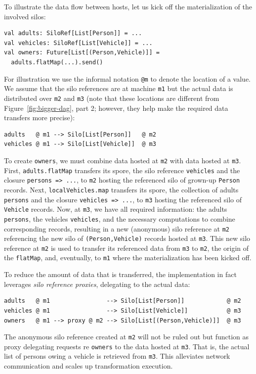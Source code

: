 \documentclass{jfp1}
\begin{document}
To illustrate the data flow between hosts, let us kick off the
materialization of the involved silos:
\begin{lstlisting}
val adults: SiloRef[List[Person]] = ...
val vehicles: SiloRef[List[Vehicle]] = ...
val owners: Future[List[(Person,Vehicle)]] =
  adults.flatMap(...).send()
\end{lstlisting}
\noindent
For illustration we use the informal notation \verb|@m| to denote the
location of a value. We assume that the silo references are at machine
\verb|m1| but the actual data is distributed over \verb|m2| and
\verb|m3| (note that these locations are different from
Figure~\ref{fig:bigger-dag}, part 2; however, they help make the
required data transfers more precise):

\begin{lstlisting}
adults   @ m1 --> Silo[List[Person]]   @ m2
vehicles @ m1 --> Silo[List[Vehicle]]  @ m3
\end{lstlisting}
\noindent
To create \verb|owners|, we must combine data hosted at \verb|m2| with
data hosted at \verb|m3|. First, \verb|adults.flatMap| transfers its
spore, \ie the silo reference \verb|vehicles| and the closure
\verb|persons => ...|, to \verb|m2| hosting the referenced silo of
grown-up \verb|Person| records. Next, \verb|localVehicles.map|
transfers its spore, \ie the collection of adults \verb|persons| and
the closure \verb|vehicles => ...|, to \verb|m3| hosting the
referenced silo of \verb|Vehicle| records. Now, at \verb|m3|, we have
all required information: the adults \verb|persons|, the vehicles
\verb|vehicles|, and the necessary computations to combine
corresponding records, resulting in a new (anonymous) silo reference
at \verb|m2| referencing the new silo of \verb|(Person,Vehicle)|
records hosted at \verb|m3|. This new silo reference at \verb|m2| is
used to transfer its referenced data from \verb|m3| to \verb|m2|, the
origin of the \verb|flatMap|, and, eventually, to \verb|m1| where the
materialization has been kicked off.

To reduce the amount of data that is transferred, the implementation in fact
leverages {\em silo reference proxies}, delegating to the actual data:

\begin{lstlisting}
adults   @ m1                --> Silo[List[Person]]            @ m2
vehicles @ m1                --> Silo[List[Vehicle]]           @ m3
owners   @ m1 --> proxy @ m2 --> Silo[List[(Person,Vehicle)]]  @ m3
\end{lstlisting}
\noindent
The anonymous silo reference created at \verb|m2| will not be ruled out but
function as proxy delegating requests re \verb|owners| to the data hosted at
\verb|m3|. That is, the actual list of persons owing a vehicle is retrieved from
\verb|m3|. This alleviates network communication and scales up transformation
execution.
\end{document}
